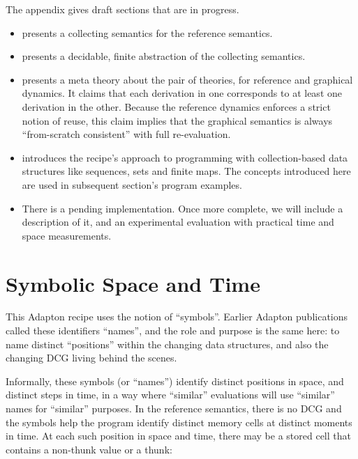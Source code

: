 \documentclass[11pt]{article}
\begin{document}
The %
appendix gives draft sections that are in progress.

\begin{itemize}

\item {} presents a collecting semantics for the reference semantics.

\item {} presents a decidable, finite abstraction of the collecting semantics.

\item {} presents a meta theory
  about the pair of theories, for reference and graphical dynamics.
  It claims that each derivation in one corresponds
  to at least one derivation in the other.  Because the reference
  dynamics enforces a strict notion of reuse, this claim implies that
  the graphical semantics is always ``from-scratch consistent'' with
  full re-evaluation.

\item {} introduces the recipe's approach to
  programming with collection-based data structures like sequences,
  sets and finite maps.  The concepts introduced here are used in
  subsequent section's program examples.

\item There is a pending implementation.  Once more
  complete, we will include a description of it, and
  an experimental evaluation with practical time and space
  measurements.

\end{itemize}

%
%
%


\section{Symbolic Space and Time}
\label{sec:symbolic-space-and-time}

This Adapton recipe uses the notion of ``symbols''.
%
Earlier Adapton publications called these identifiers ``names'', and
the role and purpose is the same here: to name distinct ``positions''
within the changing data structures, and also the changing DCG living
behind the scenes.

Informally, these symbols (or ``names'') identify distinct positions
in space, and distinct steps in time, in a way where ``similar''  
evaluations will use ``similar'' names for ``similar'' purposes.
%
In the reference semantics, there is no DCG and the symbols help the
program identify distinct memory cells at distinct moments in time.
%
At each such position in space and time, there may be a stored cell
that contains a non-thunk value or a thunk:
\end{document}
